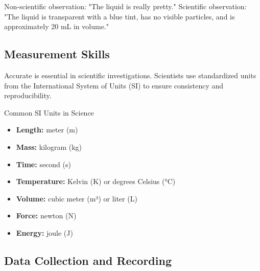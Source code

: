 \begin{example}
Non-scientific observation: "The liquid is really pretty."
Scientific observation: "The liquid is transparent with a blue tint, has no visible particles, and is approximately 20 mL in volume."
\end{example}

\subsection{Measurement Skills}

Accurate  is essential in scientific investigations. Scientists use standardized units from the International System of Units (SI) to ensure consistency and reproducibility.

\begin{keyconcept}{Common SI Units in Science}
\begin{itemize}
    \item \textbf{Length:} meter (m)
    \item \textbf{Mass:} kilogram (kg)
    \item \textbf{Time:} second (s)
    \item \textbf{Temperature:} Kelvin (K) or degrees Celsius (°C)
    \item \textbf{Volume:} cubic meter (m³) or liter (L)
    \item \textbf{Force:} newton (N)
    \item \textbf{Energy:} joule (J)
\end{itemize}
\end{keyconcept}



\subsection{Data Collection and Recording}

